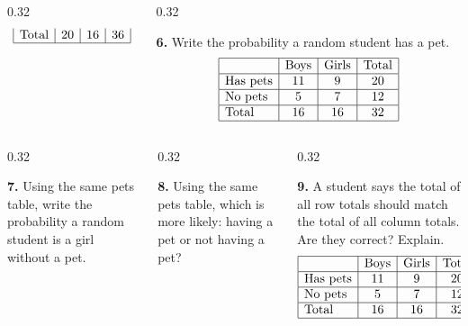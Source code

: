\documentclass[aspectratio=169,12pt]{beamer}
\newcommand{\MMProblem}[2]{\begin{MMProblemCard}\raggedright\small\textbf{#1.} #2\par\end{MMProblemCard}}
\begin{document}
\begin{frame}[t]
\begin{columns}[T,onlytextwidth]
\begin{column}{0.32\textwidth}
{\[\begin{array}{|l|c|c|c|}
\text{Total} & 20 & 16 & 36 \\\hline
\end{array}
\]}\end{column}
\begin{column}{0.32\textwidth}\MMProblem{6}{Write the probability a random student has a pet.
\[
\begin{array}{|l|c|c|c|}
\hline
 & \text{Boys} & \text{Girls} & \text{Total} \\\hline
\text{Has pets} & 11 & 9 & 20 \\\hline
\text{No pets} & 5 & 7 & 12 \\\hline
\text{Total} & 16 & 16 & 32 \\\hline
\end{array}
\]}\end{column}
\end{columns}
\vspace{0.45em}
\begin{columns}[T,onlytextwidth]
\begin{column}{0.32\textwidth}\MMProblem{7}{Using the same pets table, write the probability a random student is a girl without a pet.}\end{column}
\begin{column}{0.32\textwidth}\MMProblem{8}{Using the same pets table, which is more likely: having a pet or not having a pet?}\end{column}
\begin{column}{0.32\textwidth}\MMProblem{9}{A student says the total of all row totals should match the total of all column totals. Are they correct? Explain.
\[
\begin{array}{|l|c|c|c|}
\hline
 & \text{Boys} & \text{Girls} & \text{Total} \\\hline
\text{Has pets} & 11 & 9 & 20 \\\hline
\text{No pets} & 5 & 7 & 12 \\\hline
\text{Total} & 16 & 16 & 32 \\\hline
\end{array}
\]}\end{column}
\end{columns}
\end{frame}
\end{document}
